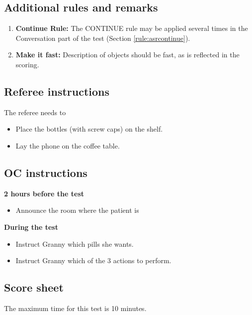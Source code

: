 \subsection{Additional rules and remarks}
\begin{enumerate}
\item \textbf{Continue Rule:} The CONTINUE rule may be applied several times in the Conversation part of the test (Section \ref{rule:asrcontinue}).
\item \textbf{Make it fast:} Description of objects should be fast, as is reflected in the scoring.
\end{enumerate}

\subsection{Referee instructions}

The referee needs to
\begin{itemize}
\item Place the bottles (with screw caps) on the shelf.
\item Lay the phone on the coffee table.
\end{itemize}

\subsection{OC instructions}

\textbf{2 hours before the test}
\begin{itemize}
\item Announce the room where the patient is
\end{itemize}
\textbf{During the test}
\begin{itemize}
\item Instruct Granny which pills she wants.
\item Instruct Granny which of the 3 actions to perform.
\end{itemize}

\subsection{Score sheet}

The maximum time for this test is 10 minutes.

